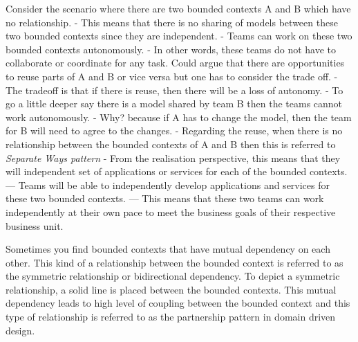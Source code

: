 \documentclass[a4paper, 11pt]{book}
\begin{document}
    Consider the scenario where there are two bounded contexts A and B which have no relationship.
    - This means that there is no sharing of models between these two bounded contexts since they are independent.
    - Teams can work on these two bounded contexts autonomously.
    - In other words, these teams do not have to collaborate or coordinate for any task.
    Could argue that there are opportunities to reuse parts of A and B or vice versa but one has to consider the trade off.
    - The tradeoff is that if there is reuse, then there will be a loss of autonomy.
    - To go a little deeper say there is a model shared by team B then the teams cannot work autonomously.
    - Why? because if A has to change the model, then the team for B will need to agree to the changes.
    - Regarding the reuse, when there is no relationship between the bounded contexts of A and B then this is referred to \textit{Separate Ways pattern}
    - From the realisation perspective, this means that they will independent set of applications or services for each of the bounded contexts.
    --- Teams will be able to independently develop applications and services for these two bounded contexts.
    --- This means that these two teams can work independently at their own pace to meet the business goals of their respective business unit.

    Sometimes you find bounded contexts that have mutual dependency on each other.
    This kind of a relationship between the bounded context is referred to as the symmetric relationship or bidirectional dependency.
    To depict a symmetric relationship, a solid line is placed between the bounded contexts.
    This mutual dependency leads to high level of coupling between the bounded context and this type of relationship is referred to as the partnership pattern in domain driven design.
\end{document}
